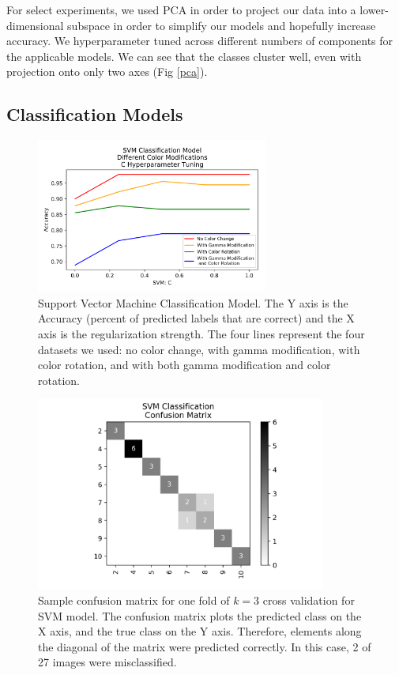 \documentclass[journal]{IEEEtran}
\begin{document}
For select experiments, we used PCA in order to project our data into a lower-dimensional subspace in order to simplify our models and hopefully increase accuracy. We hyperparameter tuned across different numbers of components for the applicable models. We can see that the classes cluster well, even with projection onto only two axes (Fig \ref{pca}).

\subsection{Classification Models}

\begin{figure}
\centering
\includegraphics[height=2in]{SVM/svm_classification.png}
\caption{Support Vector Machine Classification Model. The Y axis is the Accuracy (percent of predicted labels that are correct) and the X axis is the regularization strength. The four lines represent the four datasets we used: no color change, with gamma modification, with color rotation, and with both gamma modification and color rotation.}
\label{svm}
\end{figure}

\begin{figure}
\centering
\includegraphics[height=2.5in]{SVM/SVM_classification_cfm.png}
\caption{Sample confusion matrix for one fold of $k=3$ cross validation for SVM model. The confusion matrix plots the predicted class on the X axis, and the true class on the Y axis. Therefore, elements along the diagonal of the matrix were predicted correctly. In this case, 2 of 27 images were misclassified.}
\label{svm_confusion}
\end{figure}
\end{document}
